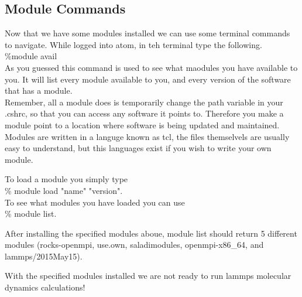 \documentclass{article}
\begin{document}
\subsection*{Module Commands}
Now that we have some modules installed we can use some terminal commands to navigate. 
While logged into atom, in teh terminal type the following.\\

\%module avail \\

As you guessed this command is used to see what maodules you have available to you. 
It will list every module available to you, and every version of the software that has a module.\\

Remember, all a module does is temporarily change the path variable in your .cshrc, so that you can access any software it points to. 
Therefore you make a module point to a location where software is being updated and maintained.
Modules are written in a languge known as tcl, the files themselvels are usually easy to understand, but this languages exist if you wish to write your own module. 

To load a module you simply type \\

\% module load "name" "version".\\

To see what modules you have loaded you can use \\

\% module list. 

After installing the specified modules aboue, module list should return 5 different modules (rocks-openmpi, use.own, saladimodules, openmpi-x86\_64, and lammps/2015May15). 

With the specified modules installed we are not ready to run lammps molecular dynamics calculations!
\end{document}
